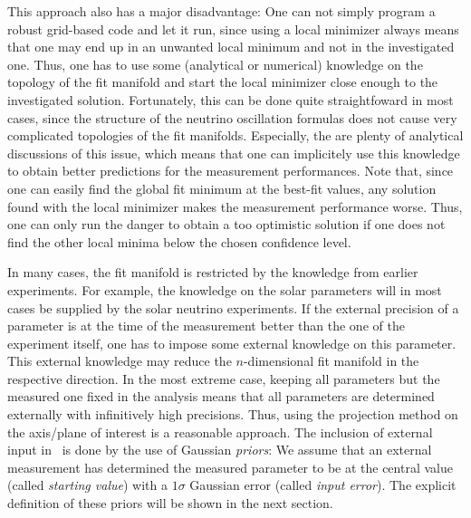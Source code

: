 This approach also has a major disadvantage: One can not simply program a robust grid-based code and let it run, since using a local minimizer always means that one may end up in an unwanted local minimum and not in the investigated one. Thus, one has to use some (analytical or numerical) knowledge on the topology of the fit manifold and start the local minimizer close enough to the investigated solution. Fortunately, this can be done quite straightfoward in most cases, since the structure of the neutrino oscillation formulas does not cause very complicated topologies of the fit manifolds. Especially, the are plenty of analytical discussions of this issue, which means that one can implicitely use this knowledge to obtain better predictions for the measurement performances. Note that, since one can easily find the global fit minimum at the best-fit values, any solution found with the local minimizer makes the measurement performance worse. Thus, one can only run the danger to obtain a too optimistic solution if one does not find the other local minima below the chosen confidence level.

In many cases, the fit manifold is restricted by the knowledge from earlier experiments. For example, the knowledge on the solar parameters will in most cases be supplied by the solar neutrino experiments. If the external precision of a parameter is at the time of the measurement better than the one of the experiment itself, one has to impose some external knowledge on this parameter. This external knowledge may reduce the $n$-dimensional fit manifold in the respective direction. In the most extreme case, keeping all parameters but the measured one fixed in the analysis means that all parameters are determined externally with infinitively high precisions. Thus, using the projection method on the axis/plane of interest is a reasonable approach. The inclusion of external input in \GLOBES\ is done by the use of Gaussian {\em priors}: We assume that an external measurement has determined the measured parameter to be at the central value (called {\em starting value}) with a $1 \sigma$ Gaussian error (called {\em input error}). The explicit definition of these priors will be shown in the next section.

